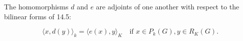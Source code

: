 The homomorphisms $d$ and $e$ are adjoints of one another with respect to the bilinear forms of 14.5:

$$\langle x, d(y) \rangle_k = \langle e(x), y \rangle_K \quad \text{if } x \in P_k(G), y \in R_K(G).$$